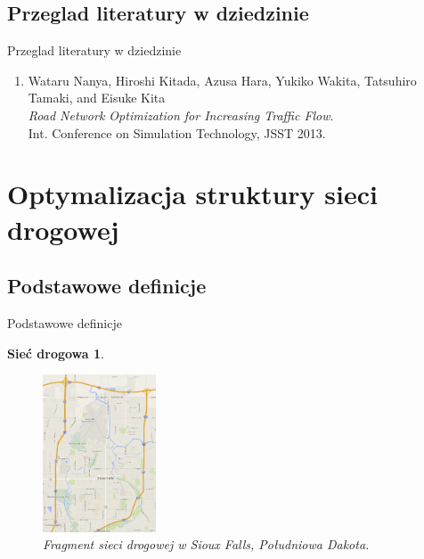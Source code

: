 \documentclass{beamer}
\begin{document}
\subsection{Przeglad literatury w dziedzinie}
\begin{frame}{Przeglad literatury w dziedzinie} 

\begin{enumerate}

\item {
Wataru Nanya, Hiroshi Kitada, Azusa Hara, Yukiko Wakita, Tatsuhiro Tamaki, and Eisuke Kita\\
\emph{Road Network Optimization for Increasing Traffic Flow}. \\
Int. Conference on Simulation Technology, JSST 2013.}

\end{enumerate}
\end{frame}


\section{Optymalizacja struktury sieci drogowej}
\subsection{Podstawowe definicje}
\begin{frame}{Podstawowe definicje} 

\newtheorem{mydef1}{Sieć drogowa}
\begin{mydef1}
	\begin{figure}[h!]
	\includegraphics[width=0.30\textwidth]{img/siec}
	\caption{Fragment sieci drogowej w Sioux Falls, Południowa Dakota.} 
	\end{figure}
\end{mydef1}

\end{frame}
\end{document}
